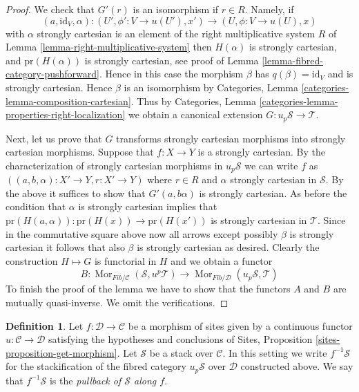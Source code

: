 \documentclass{stacks-project}
\theoremstyle{plain}
\theoremstyle{definition}
\newtheorem{definition}[subsection]{Definition}
\theoremstyle{remark}
\numberwithin{equation}{subsection}
\def\Mor{\mathop{\mathrm{Mor}}\nolimits}
\begin{document}
\begin{proof}
\medskip\noindent
We check that $G'(r)$ is an isomorphism if $r \in R$.
Namely, if
$$
(a, \text{id}_V, \alpha) :
(U', \phi' : V \to u(U'), x')
\longrightarrow
(U, \phi : V \to u(U), x)
$$
with $\alpha$ strongly cartesian is an element of the right multiplicative
system $R$ of
Lemma \ref{lemma-right-multiplicative-system}
then $H(\alpha)$ is strongly cartesian, and
$\text{pr}(H(\alpha))$ is strongly cartesian, see proof of
Lemma \ref{lemma-fibred-category-pushforward}.
Hence in this case the morphism $\beta$ has $q(\beta) = \text{id}_V$
and is strongly cartesian. Hence $\beta$ is an isomorphism by
Categories, Lemma \ref{categories-lemma-composition-cartesian}.
Thus by
Categories, Lemma \ref{categories-lemma-properties-right-localization}
we obtain a canonical extension $G : u_p\mathcal{S} \to \mathcal{T}$.

\medskip\noindent
Next, let us prove that $G$ transforms strongly cartesian morphisms
into strongly cartesian morphisms.
Suppose that $f : X \to Y$ is a strongly cartesian. By the characterization
of strongly cartesian morphisms in $u_p\mathcal{S}$ we can write $f$ as
$((a, b, \alpha) : X' \to Y, r : X' \to Y)$ where $r \in R$ and
$\alpha$ strongly cartesian in $\mathcal{S}$. By the above it suffices
to show that $G'(a, b \alpha)$ is strongly cartesian. As before
the condition that $\alpha$ is strongly cartesian implies that
$\text{pr}(H(a, \alpha)) : \text{pr}(H(x)) \to \text{pr}(H(x'))$
is strongly cartesian in $\mathcal{T}$. Since in the commutative
square above now all arrows except possibly $\beta$ is strongly cartesian
it follows that also $\beta$ is strongly cartesian as desired.
Clearly the construction $H \mapsto G$ is functorial in $H$ and we
obtain a functor
$$
B :
\Mor_{\textit{Fib}/\mathcal{C}}(\mathcal{S}, u^p\mathcal{T})
\longrightarrow
\Mor_{\textit{Fib}/\mathcal{D}}(u_p\mathcal{S}, \mathcal{T})
$$
To finish the proof of the lemma we have to show that the functors
$A$ and $B$ are mutually quasi-inverse. We omit the verifications.
\end{proof}

\begin{definition}
\label{definition-pullback-stack}
Let $f : \mathcal{D} \to \mathcal{C}$ be a morphism of sites
given by a continuous functor $u : \mathcal{C} \to \mathcal{D}$
satisfying the hypotheses and conclusions of
Sites, Proposition \ref{sites-proposition-get-morphism}.
Let $\mathcal{S}$ be a stack over $\mathcal{C}$.
In this setting we write {\it $f^{-1}\mathcal{S}$} for the stackification
of the fibred category $u_p\mathcal{S}$ over $\mathcal{D}$ constructed
above. We say that $f^{-1}\mathcal{S}$ is the
{\it pullback of $\mathcal{S}$ along $f$}.
\end{definition}
\end{document}
